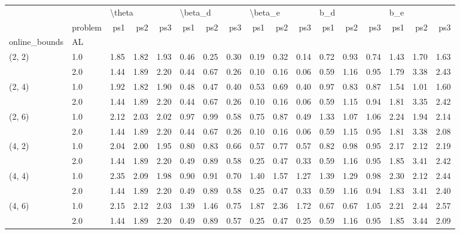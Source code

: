 \begin{tabular}{llrrrrrrrrrrrrrrr}
\toprule
       & {} & \multicolumn{3}{l}{\textbackslash theta} & \multicolumn{3}{l}{\textbackslash beta\_d} & \multicolumn{3}{l}{\textbackslash beta\_e} & \multicolumn{3}{l}{b\_d} & \multicolumn{3}{l}{b\_e} \\
       & problem &    ps1 &  ps2 &  ps3 &     ps1 &  ps2 &  ps3 &     ps1 &  ps2 &  ps3 &  ps1 &  ps2 &  ps3 &  ps1 &  ps2 &  ps3 \\
online\_bounds & AL &        &      &      &         &      &      &         &      &      &      &      &      &      &      &      \\
\midrule
(2, 2) & 1.0 &   1.85 & 1.82 & 1.93 &    0.46 & 0.25 & 0.30 &    0.19 & 0.32 & 0.14 & 0.72 & 0.93 & 0.74 & 1.43 & 1.70 & 1.63 \\
       & 2.0 &   1.44 & 1.89 & 2.20 &    0.44 & 0.67 & 0.26 &    0.10 & 0.16 & 0.06 & 0.59 & 1.16 & 0.95 & 1.79 & 3.38 & 2.43 \\
(2, 4) & 1.0 &   1.92 & 1.82 & 1.90 &    0.48 & 0.47 & 0.40 &    0.53 & 0.69 & 0.40 & 0.97 & 0.83 & 0.87 & 1.54 & 1.01 & 1.60 \\
       & 2.0 &   1.44 & 1.89 & 2.20 &    0.44 & 0.67 & 0.26 &    0.10 & 0.16 & 0.06 & 0.59 & 1.15 & 0.94 & 1.81 & 3.35 & 2.42 \\
(2, 6) & 1.0 &   2.12 & 2.03 & 2.02 &    0.97 & 0.99 & 0.58 &    0.75 & 0.87 & 0.49 & 1.33 & 1.07 & 1.06 & 2.24 & 1.94 & 2.14 \\
       & 2.0 &   1.44 & 1.89 & 2.20 &    0.44 & 0.67 & 0.26 &    0.10 & 0.16 & 0.06 & 0.59 & 1.15 & 0.95 & 1.81 & 3.38 & 2.08 \\
(4, 2) & 1.0 &   2.04 & 2.00 & 1.95 &    0.80 & 0.83 & 0.66 &    0.57 & 0.77 & 0.57 & 0.82 & 0.98 & 0.95 & 2.17 & 2.12 & 2.19 \\
       & 2.0 &   1.44 & 1.89 & 2.20 &    0.49 & 0.89 & 0.58 &    0.25 & 0.47 & 0.33 & 0.59 & 1.16 & 0.95 & 1.85 & 3.41 & 2.42 \\
(4, 4) & 1.0 &   2.35 & 2.09 & 1.98 &    0.90 & 0.91 & 0.70 &    1.40 & 1.57 & 1.27 & 1.39 & 1.29 & 0.98 & 2.30 & 2.12 & 2.44 \\
       & 2.0 &   1.44 & 1.89 & 2.20 &    0.49 & 0.89 & 0.58 &    0.25 & 0.47 & 0.33 & 0.59 & 1.16 & 0.94 & 1.83 & 3.41 & 2.40 \\
(4, 6) & 1.0 &   2.15 & 2.12 & 2.03 &    1.39 & 1.46 & 0.75 &    1.87 & 2.36 & 1.72 & 0.67 & 0.67 & 1.05 & 2.21 & 2.44 & 2.57 \\
       & 2.0 &   1.44 & 1.89 & 2.20 &    0.49 & 0.89 & 0.57 &    0.25 & 0.47 & 0.25 & 0.59 & 1.16 & 0.95 & 1.85 & 3.44 & 2.09 \\

\end{tabular}

